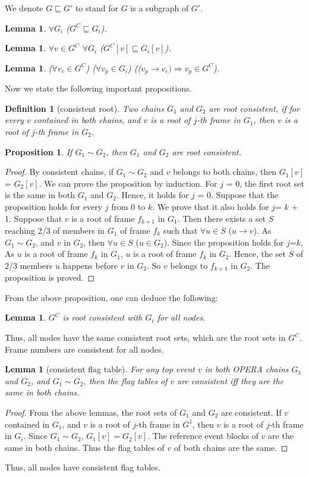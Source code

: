 \documentclass{article}
\newtheorem{lem}[thm]{Lemma}
\newtheorem{prop}[thm]{Proposition}
\newtheorem{defn}{Definition}[section]
\newcommand{\hbefore}{\rightarrow}
\begin{document}
We denote $G \sqsubseteq G'$ to stand for $G$ is a subgraph of $G'$.
\begin{lem}
	$\forall G_i$ ($G^C \sqsubseteq G_i$).
\end{lem}
\begin{lem}
	$\forall v \in G^C$ $\forall G_i$ ($G^C[v] \sqsubseteq G_i[v]$).
\end{lem}
\begin{lem}
	($\forall v_c \in G^C$) ($\forall v_p \in G_i$) (($v_p \hbefore v_c) \Rightarrow v_p \in G^C$).
\end{lem}

Now we state the following important propositions.
\begin{defn}[consistent root]
	Two chains $G_1$ and $G_2$ are root consistent, if for every $v$ contained in both chains, and $v$ is a root of $j$-th frame in $G_1$, then $v$ is a root of $j$-th frame in $G_2$.
\end{defn}
\begin{prop}
	If $G_1 \sim G_2$, then $G_1$ and $G_2$ are root consistent.
\end{prop}
\begin{proof}
	By consistent chains, if $G_1 \sim G_2$ and $v$ belongs to both chains, then $G_1[v]$ = $G_2[v]$.
	We can prove the proposition by induction. For $j$ = 0, the first root set is the same in both $G_1$ and $G_2$. Hence, it holds for $j$ = 0. Suppose that the proposition holds for every $j$ from 0 to $k$. We prove that it also holds for $j$= $k$ + 1.
	 Suppose that $v$ is a root of frame $f_{k+1}$ in $G_1$. 
	Then there exists a set $S$ reaching 2/3 of members in $G_1$ of frame $f_k$ such that $\forall u \in S$ ($u\hbefore v$). As $G_1 \sim G_2$, and $v$ in $G_2$, then $\forall u \in S$ ($u \in G_2$). Since the proposition holds for $j$=$k$, 
	As $u$ is a root of frame $f_{k}$ in $G_1$, $u$ is a root of frame $f_k$ in $G_2$. Hence, the set $S$ of 2/3 members $u$ happens before $v$ in $G_2$. So $v$ belongs to $f_{k+1}$ in $G_2$. The proposition is proved.
\end{proof}

From the above proposition, one can deduce the following:
\begin{lem}
		$G^C$ is root consistent with $G_i$ for all nodes.
 \end{lem}
Thus, all nodes have the same consistent root sets, which are the root sets in $G^C$. Frame numbers are consistent for all nodes.


\begin{lem}[consistent flag table] For any top event $v$ in both OPERA chains $G_1$ and $G_2$, and $G_1 \sim G_2$, then the flag tables of $v$ are consistent iff they are the same in both chains.
\end{lem}
\begin{proof}
	From the above lemmas, the root sets of $G_1$ and $G_2$ are consistent. If $v$ contained in $G_1$, and $v$ is a root of $j$-th frame in $G^1$, then $v$ is a root of $j$-th frame in $G_i$. Since $G_1 \sim G_2$, $G_1[v] = G_2[v]$. The reference event blocks of $v$ are the same in both chains. Thus the flag tables of $v$ of both chains are the same.
\end{proof}
Thus, all nodes have consistent flag tables.
\end{document}
